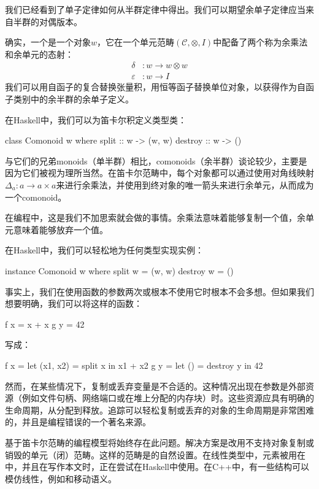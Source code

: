 \documentclass[DaoFP]{subfiles}
\begin{document}
我们已经看到了单子定律如何从半群定律中得出。我们可以期望余单子定律应当来自半群的对偶版本。

确实，一个是一个对象$w$，它在一个单元范畴$(\mathcal{C}, \otimes, I)$中配备了两个称为余乘法和余单元的态射：
\begin{align*}
\delta &\colon w \to w \otimes w \\
\varepsilon &\colon w \to I
\end{align*}
我们可以用自函子的复合替换张量积，用恒等函子替换单位对象，以获得作为自函子类别中的余半群的余单子定义。

在Haskell中，我们可以为笛卡尔积定义类型类：
\begin{haskell}
class Comonoid w where
split   :: w -> (w, w)
destroy :: w -> ()
\end{haskell}

与它们的兄弟monoids（单半群）相比，comonoids（余半群）谈论较少，主要是因为它们被视为理所当然。在笛卡尔范畴中，每个对象都可以通过使用对角线映射$\Delta_a \colon a \to a \times a$来进行余乘法，并使用到终对象的唯一箭头来进行余单元，从而成为一个comonoid。

在编程中，这是我们不加思索就会做的事情。余乘法意味着能够复制一个值，余单元意味着能够放弃一个值。

在Haskell中，我们可以轻松地为任何类型实现实例：
\begin{haskell}
instance Comonoid w where
split w   = (w, w)
destroy w = ()
\end{haskell}
事实上，我们在使用函数的参数两次或根本不使用它时根本不会多想。但如果我们想要明确，我们可以将这样的函数：
\begin{haskell}
f x = x + x
g y = 42
\end{haskell}
写成：
\begin{haskell}
f x = let (x1, x2) = split x
in x1 + x2
g y = let () = destroy y
in 42
\end{haskell}

然而，在某些情况下，复制或丢弃变量是不合适的。这种情况出现在参数是外部资源（例如文件句柄、网络端口或在堆上分配的内存块）时。这些资源应具有明确的生命周期，从分配到释放。追踪可以轻松复制或丢弃的对象的生命周期是非常困难的，并且是编程错误的一个著名来源。

基于笛卡尔范畴的编程模型将始终存在此问题。解决方案是改用不支持对象复制或销毁的单元（闭）范畴。这样的范畴是的自然设置。在线性类型中，元素被用在中，并且在写作本文时，正在尝试在Haskell中使用。在C++中，有一些结构可以模仿线性，例如和移动语义。
\end{document}
